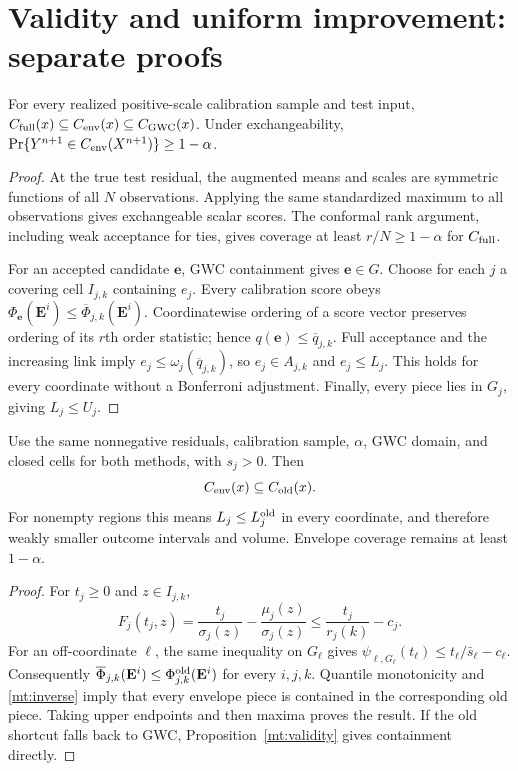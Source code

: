 \section{Validity and uniform improvement: separate proofs}
\begin{mtproposition}\label{mt:validity}
For every realized positive-scale calibration sample and test input,
$C_{\rm full}(x)\subseteq C_{\rm env}(x)\subseteq C_{\rm GWC}(x)$.
Under exchangeability, $\Pr\{Y^{n+1}\in C_{\rm env}(X^{n+1})\}\ge1-\alpha$.
\end{mtproposition}
\begin{proof}
At the true test residual, the augmented means and scales are symmetric
functions of all $N$ observations. Applying the same standardized maximum
to all observations gives exchangeable scalar scores. The conformal rank
argument, including weak acceptance for ties, gives coverage at least
$r/N\ge1-\alpha$ for $C_{\rm full}$.

For an accepted candidate $\mathbf e$, GWC containment gives $\mathbf e\in G$.
Choose for each $j$ a covering cell $I_{j,k}$ containing $e_j$.
Every calibration score obeys
$\Phi_{\mathbf e}(\mathbf E^i)\le\overline\Phi_{j,k}(\mathbf E^i)$.
Coordinatewise ordering of a score vector preserves ordering of its $r$th
order statistic; hence $q(\mathbf e)\le\overline q_{j,k}$.
Full acceptance and the increasing link imply
$e_j\le\omega_j(\overline q_{j,k})$, so $e_j\in A_{j,k}$ and $e_j\le L_j$.
This holds for every coordinate without a Bonferroni adjustment.
Finally, every piece lies in $G_j$, giving $L_j\le U_j$.
\end{proof}

\begin{mttheorem}\label{mt:dominance}
Use the same nonnegative residuals, calibration sample, $\alpha$, GWC domain,
and closed cells for both methods, with $s_j>0$. Then
\[
 C_{\rm env}(x)\subseteq C_{\rm old}(x).
\]
For nonempty regions this means $L_j\le L_j^{\rm old}$ in every coordinate,
and therefore weakly smaller outcome intervals and volume. Envelope coverage
remains at least $1-\alpha$.
\end{mttheorem}
\begin{proof}
For $t_j\ge0$ and $z\in I_{j,k}$,
\[
 F_j(t_j,z)=\frac{t_j}{\sigma_j(z)}-\frac{\mu_j(z)}{\sigma_j(z)}
 \le\frac{t_j}{r_j(k)}-c_j.
\]
For an off-coordinate $\ell$, the same inequality on $G_\ell$ gives
$\psi_{\ell,G_\ell}(t_\ell)\le t_\ell/\bar s_\ell-c_\ell$.
Consequently $\overline\Phi_{j,k}(\mathbf E^i)\le
\Phi^{\rm old}_{j,k}(\mathbf E^i)$ for every $i,j,k$.
Quantile monotonicity and \eqref{mt:inverse} imply that every envelope piece
is contained in the corresponding old piece. Taking upper endpoints and
then maxima proves the result. If the old shortcut falls back to GWC,
Proposition~\ref{mt:validity} gives containment directly.
\end{proof}

